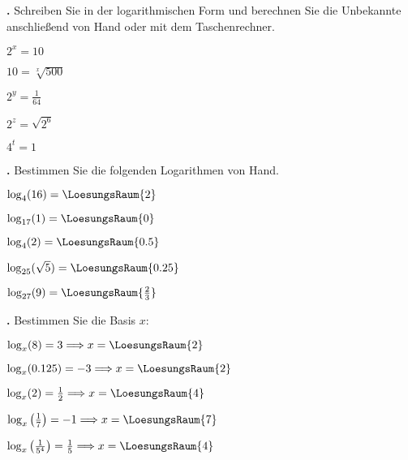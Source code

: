\newpage

\textbf{\bbwAufgabenNummer{}.}
Schreiben Sie in der logarithmischen Form und berechnen Sie die
Unbekannte anschließend von Hand oder mit dem Taschenrechner.

\begin{bbwAufgabenBlock}
\item $2^x = 10$   
\item $10=\sqrt[x]{500}$ 

\item $2^y = \frac{1}{64}$   
\item $2^z = \sqrt{2^6}$   
\item $4^t= 1$   
\end{bbwAufgabenBlock}



\newpage

\textbf{\bbwAufgabenNummer{}.}
Bestimmen Sie die folgenden Logarithmen von Hand.

\begin{bbwAufgabenBlock}
\item $\log_4(16)     =    \LoesungsRaum{2}$
\item $\log_{17}(1)     =    \LoesungsRaum{0}$
\item $\log_4(2)     =    \LoesungsRaum{0.5}$
\item $\log_{25}(\sqrt{5})     =    \LoesungsRaum{0.25}$
\item $\log_{27}(9)     =    \LoesungsRaum{\frac23}$
\end{bbwAufgabenBlock}

\newpage

\textbf{\bbwAufgabenNummer{}.}
Bestimmen Sie die Basis $x$:

\begin{bbwAufgabenBlock}
\item $\log_x(8) = 3 \Longrightarrow x =    \LoesungsRaum{2}$
\item $\log_x(0.125) = -3 \Longrightarrow x =    \LoesungsRaum{2}$
\item $\log_x(2) = \frac12 \Longrightarrow x =    \LoesungsRaum{4}$
\item $\log_x\left(\frac17\right) = -1 \Longrightarrow x =    \LoesungsRaum{7}$
\item $\log_x\left(\frac1{5^4}\right) = \frac15 \Longrightarrow x =    \LoesungsRaum{4}$

\end{bbwAufgabenBlock}


